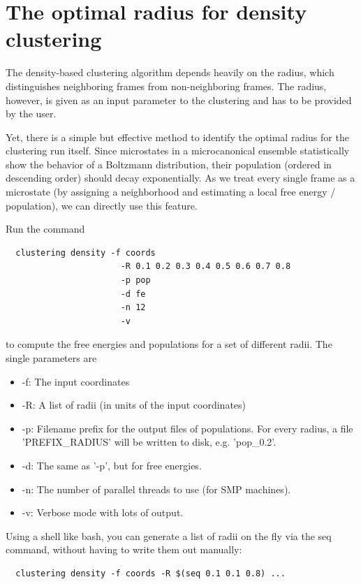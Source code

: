 \documentclass[12pt,a4paper,twoside,english,fleqn]{article}
\begin{document}
\section{The optimal radius for density clustering}
The density-based clustering algorithm depends heavily on the radius, which
distinguishes neighboring frames from non-neighboring frames.
The radius, however, is given as an input parameter to the clustering and has
to be provided by the user.

Yet, there is a simple but effective method to identify the optimal radius for
the clustering run itself. Since microstates in a microcanonical ensemble
statistically show the behavior of a Boltzmann distribution, their population
(ordered in descending order) should decay exponentially.
As we treat every single frame as a microstate (by assigning a neighborhood
and estimating a local free energy / population), we can directly use this
feature.

Run the command

\begin{lstlisting}
  clustering density -f coords
                       -R 0.1 0.2 0.3 0.4 0.5 0.6 0.7 0.8
                       -p pop
                       -d fe
                       -n 12
                       -v
\end{lstlisting}

to compute the free energies and populations for a set of different radii.
The single parameters are
\begin{itemize}
  \item -f: The input coordinates
  \item -R: A list of radii (in units of the input coordinates)
  \item -p: Filename prefix for the output files of populations.
            For every radius, a file 'PREFIX\_RADIUS' will be written
            to disk, e.g. 'pop\_0.2'.
  \item -d: The same as '-p', but for free energies.
  \item -n: The number of parallel threads to use (for SMP machines).
  \item -v: Verbose mode with lots of output.
\end{itemize}

Using a shell like bash, you can generate a list of radii on the fly via the
{\ttfamily seq} command, without having to write them out manually:
\begin{lstlisting}
  clustering density -f coords -R $(seq 0.1 0.1 0.8) ...
\end{lstlisting}
\end{document}
